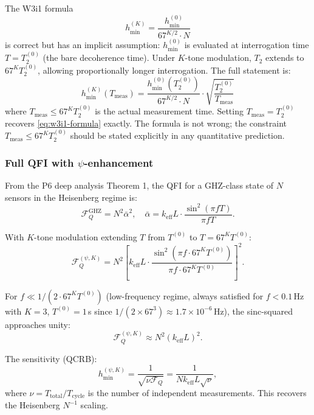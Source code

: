 \documentclass[11pt]{article}
\theoremstyle{definition}
\theoremstyle{remark}
\begin{document}
The W3i1 formula
\begin{equation}
h_{\min}^{(K)} = \frac{h_{\min}^{(0)}}{67^{K/2} \cdot N}
\label{eq:w3i1-formula}
\end{equation}
is correct but has an implicit assumption: $h_{\min}^{(0)}$ is evaluated
at interrogation time $T = T_2^{(0)}$ (the bare decoherence time). Under
$K$-tone modulation, $T_2$ extends to $67^K T_2^{(0)}$, allowing
proportionally longer interrogation. The full statement is:
\begin{equation}
\boxed{h_{\min}^{(K)}(T_{\mathrm{meas}})
= \frac{h_{\min}^{(0)}(T_2^{(0)})}{67^{K/2} \cdot N}
\cdot \sqrt{\frac{T_2^{(0)}}{T_{\mathrm{meas}}}}}
\label{eq:corrected-formula}
\end{equation}
where $T_{\mathrm{meas}} \leq 67^K T_2^{(0)}$ is the actual measurement
time. Setting $T_{\mathrm{meas}} = T_2^{(0)}$ recovers \eqref{eq:w3i1-formula}
exactly. The formula is not wrong; the constraint $T_{\mathrm{meas}} \leq 67^K T_2^{(0)}$
should be stated explicitly in any quantitative prediction.

\subsubsection{Full QFI with $\psi$-enhancement}

From the P6 deep analysis Theorem 1, the QFI for a GHZ-class state of
$N$ sensors in the Heisenberg regime is:
\begin{equation}
\mathcal{F}_Q^{\mathrm{GHZ}} = N^2 \bar{\alpha}^2,
\quad \bar{\alpha} = k_{\mathrm{eff}} L
\cdot \frac{\sin^2(\pi f T)}{\pi f T}.
\end{equation}

With $K$-tone modulation extending $T$ from $T^{(0)}$ to $T = 67^K T^{(0)}$:
\begin{equation}
\mathcal{F}_Q^{(\psi,K)} = N^2 \left[k_{\mathrm{eff}} L
\cdot \frac{\sin^2(\pi f \cdot 67^K T^{(0)})}{\pi f \cdot 67^K T^{(0)}}\right]^2.
\label{eq:full-qfi}
\end{equation}

For $f \ll 1/(2 \cdot 67^K T^{(0)})$ (low-frequency regime, always
satisfied for $f < 0.1$\,Hz with $K=3$, $T^{(0)}=1$\,s since
$1/(2\times67^3) \approx 1.7\times10^{-6}$\,Hz), the sinc-squared
approaches unity:
\begin{equation}
\mathcal{F}_Q^{(\psi,K)} \approx N^2 (k_{\mathrm{eff}} L)^2.
\end{equation}

The sensitivity (QCRB):
\begin{equation}
h_{\min}^{(\psi,K)} = \frac{1}{\sqrt{\nu \mathcal{F}_Q}}
= \frac{1}{N k_{\mathrm{eff}} L \sqrt{\nu}},
\end{equation}
where $\nu = T_{\mathrm{total}} / T_{\mathrm{cycle}}$ is the number of
independent measurements. This recovers the Heisenberg $N^{-1}$ scaling.
\end{document}

